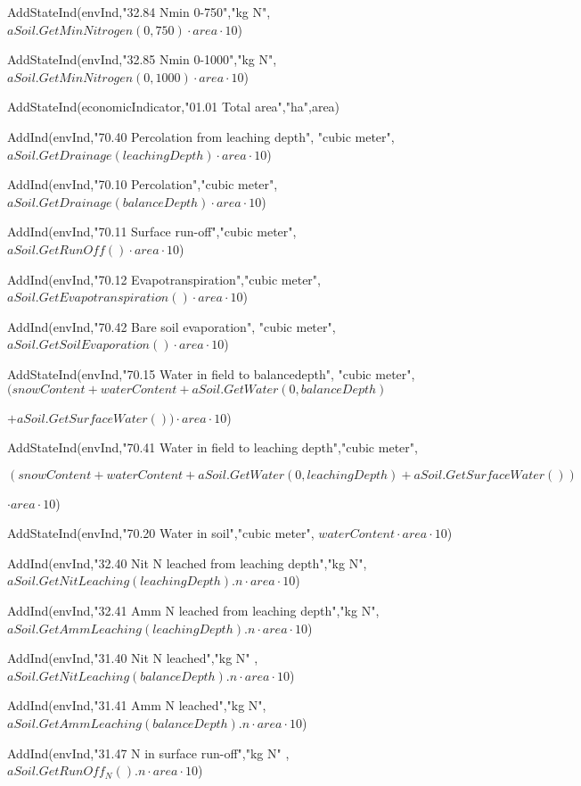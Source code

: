 \documentclass[%
]{scrartcl}
\begin{document}
{{{AddStateInd(envInd,"32.84 Nmin 0-750","kg N",
$aSoil.GetMinNitrogen(0,750) \cdot area \cdot 10$)
	
AddStateInd(envInd,"32.85 Nmin 0-1000","kg N",
$aSoil.GetMinNitrogen(0,1000) \cdot area \cdot 10$)

  AddStateInd(economicIndicator,"01.01 Total area","ha",area)

   AddInd(envInd,"70.40 Percolation from leaching depth",
"cubic meter",$aSoil.GetDrainage(leachingDepth) \cdot area \cdot 10$)
   
AddInd(envInd,"70.10 Percolation","cubic meter",
$aSoil.GetDrainage(balanceDepth) \cdot area \cdot 10$)
   
AddInd(envInd,"70.11 Surface run-off","cubic meter",
$aSoil.GetRunOff() \cdot area \cdot 10$)

	 
AddInd(envInd,"70.12 Evapotranspiration","cubic meter",
$aSoil.GetEvapotranspiration() \cdot area \cdot 10$)
	 
AddInd(envInd,"70.42 Bare soil evaporation",
"cubic meter",$aSoil.GetSoilEvaporation() \cdot area \cdot 10$)
	
AddStateInd(envInd,"70.15 Water in field to balancedepth",
"cubic meter",$(snowContent+waterContent+aSoil.GetWater(0,balanceDepth)$

$+aSoil.GetSurfaceWater()) \cdot area \cdot 10$)
	
AddStateInd(envInd,"70.41 Water in field to leaching depth","cubic meter",

$(snowContent+waterContent+aSoil.GetWater(0,leachingDepth)+aSoil.GetSurfaceWater()) $

$\cdot area \cdot 10$)
	
AddStateInd(envInd,"70.20 Water in soil","cubic meter",
$waterContent \cdot area \cdot 10$)

   AddInd(envInd,"32.40 Nit N leached from leaching 
depth","kg N",$aSoil.GetNitLeaching(leachingDepth).n \cdot area \cdot 10$)
 
  AddInd(envInd,"32.41 Amm N leached from leaching 
depth","kg N",$aSoil.GetAmmLeaching(leachingDepth).n \cdot area \cdot 10$)
   
AddInd(envInd,"31.40 Nit N leached","kg N"
,$aSoil.GetNitLeaching(balanceDepth).n \cdot area \cdot 10$)
	 
AddInd(envInd,"31.41 Amm N leached","kg N",
$aSoil.GetAmmLeaching(balanceDepth).n \cdot area \cdot 10$)
	
 AddInd(envInd,"31.47 N in surface run-off","kg N"
,$aSoil.GetRunOff_N().n \cdot area \cdot 10$)
	
}}}
\end{document}

